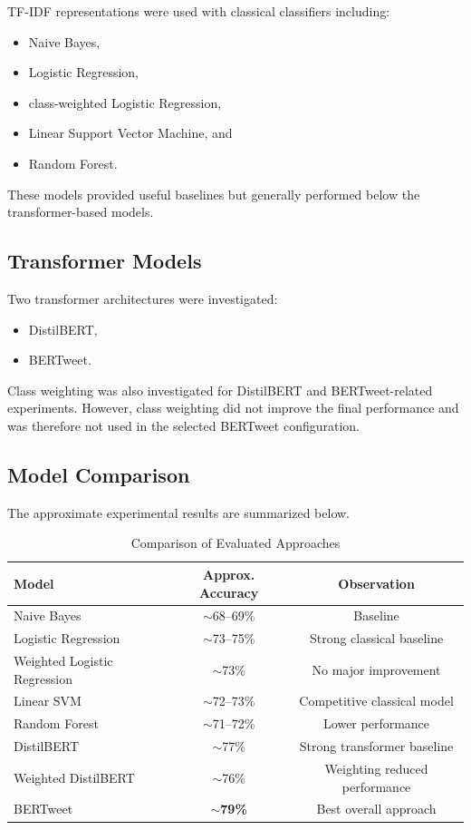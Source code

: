 \documentclass[12pt,a4paper]{article}
\begin{document}
TF-IDF representations were used with classical classifiers including:

\begin{itemize}
    \item Naive Bayes,
    \item Logistic Regression,
    \item class-weighted Logistic Regression,
    \item Linear Support Vector Machine, and
    \item Random Forest.
\end{itemize}

These models provided useful baselines but generally performed below the
transformer-based models.

\subsection{Transformer Models}

Two transformer architectures were investigated:

\begin{itemize}
    \item DistilBERT,
    \item BERTweet.
\end{itemize}

Class weighting was also investigated for DistilBERT and BERTweet-related
experiments. However, class weighting did not improve the final performance
and was therefore not used in the selected BERTweet configuration.

\subsection{Model Comparison}

The approximate experimental results are summarized below.

\begin{table}[H]
\centering
\caption{Comparison of Evaluated Approaches}
\begin{tabular}{lcc}
\toprule
\textbf{Model} & \textbf{Approx. Accuracy} & \textbf{Observation} \\
\midrule
Naive Bayes & $\sim$68--69\% & Baseline \\
Logistic Regression & $\sim$73--75\% & Strong classical baseline \\
Weighted Logistic Regression & $\sim$73\% & No major improvement \\
Linear SVM & $\sim$72--73\% & Competitive classical model \\
Random Forest & $\sim$71--72\% & Lower performance \\
DistilBERT & $\sim$77\% & Strong transformer baseline \\
Weighted DistilBERT & $\sim$76\% & Weighting reduced performance \\
BERTweet & \textbf{$\sim$79\%} & Best overall approach \\
\bottomrule
\end{tabular}
\end{table}
\end{document}
